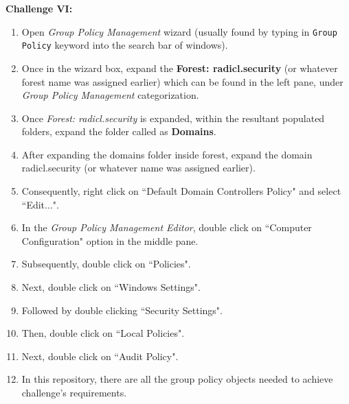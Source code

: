 \documentclass[12pt]{extarticle}
\newcommand{\ben}{\begin{enumerate}}
\newcommand{\een}{\end{enumerate}}
\begin{document}
		
		\vspace{4mm}
		\item \textbf{Challenge VI:}
		\ben
			\item Open \textit{Group Policy Management} wizard (usually found by typing in \texttt{Group Policy} keyword into the search bar of windows).
			\item Once in the wizard box, expand the \textbf{Forest: radicl.security} (or whatever forest name was assigned earlier) which can be found in the left pane, under \textit{Group Policy Management} categorization.
			\item Once \textit{Forest: radicl.security} is expanded, within the resultant populated folders, expand the folder called as \textbf{Domains}.
			\item After expanding the domains folder inside forest, expand the domain radicl.security (or whatever name was assigned earlier).
			\item Consequently, right click on ``Default Domain Controllers Policy" and select ``Edit...".
			\item In the \textit{Group Policy Management Editor}, double click on ``Computer Configuration" option in the middle pane.
			\item Subsequently, double click on ``Policies".
			\item Next, double click on ``Windows Settings".
			\item Followed by double clicking ``Security Settings".
			\item Then, double click on ``Local Policies".
			\item Next, double click on ``Audit Policy".
			\item In this repository, there are all the group policy objects needed to achieve challenge's requirements.
		\een
		
		
		
\end{document}
